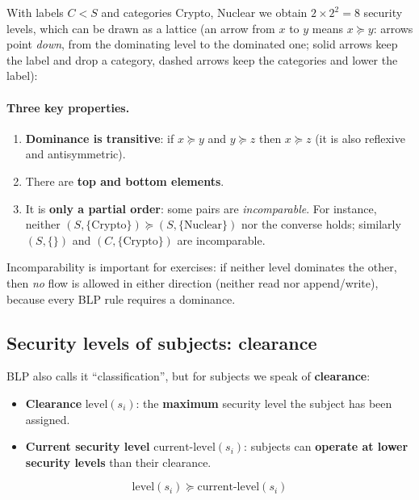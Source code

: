 With labels $C < S$ and categories Crypto, Nuclear we obtain $2 \times 2^2 = 8$ security levels, which can be drawn as a lattice (an arrow from $x$ to $y$ means $x \succeq y$: arrows point \emph{down}, from the dominating level to the dominated one; solid arrows keep the label and drop a category, dashed arrows keep the categories and lower the label):

\paragraph{Three key properties.}
\begin{enumerate}
    \item[(a)] \textbf{Dominance is transitive}: if $x \succeq y$ and $y \succeq z$ then $x \succeq z$ (it is also reflexive and antisymmetric).
    \item[(b)] There are \textbf{top and bottom elements}.
    \item[(c)] It is \textbf{only a partial order}: some pairs are \emph{incomparable}. For instance, neither $(S, \{\text{Crypto}\}) \succeq (S, \{\text{Nuclear}\})$ nor the converse holds; similarly $(S, \{\}) $ and $(C, \{\text{Crypto}\})$ are incomparable.
\end{enumerate}

\begin{remark}
Incomparability is important for exercises: if neither level dominates the other, then \emph{no} flow is allowed in either direction (neither read nor append/write), because every BLP rule requires a dominance.
\end{remark}

\subsection{Security levels of subjects: clearance}

BLP also calls it ``classification'', but for subjects we speak of \textbf{clearance}:
\begin{itemize}
    \item \textbf{Clearance} $\text{level}(s_i)$: the \textbf{maximum} security level the subject has been assigned.
    \item \textbf{Current security level} $\text{current-level}(s_i)$: subjects can \textbf{operate at lower security levels} than their clearance.
\end{itemize}
\[
\boxed{\text{level}(s_i) \succeq \text{current-level}(s_i)}
\]

